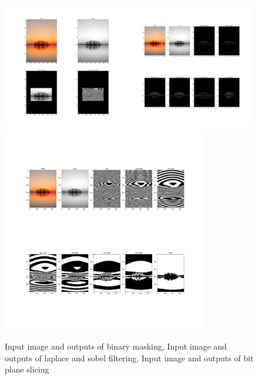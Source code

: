 \documentclass{article}
\begin{document}
{{        \begin{figure}[htp]
            \centering
            \includegraphics[width=0.49\textwidth]{Assignment-5/mask-img.jpg}
            \includegraphics[width=0.49\textwidth]{Assignment-5/Laplace-&-Sobel-Filtering.jpg}
            \includegraphics[width=0.8\textwidth]{Assignment-5/bit-wise-image.jpg}
            \caption{Input image and outputs of binary masking, Input image and outputs of laplace and sobel filtering, Input image and outputs of bit plane slicing}
        \end{figure}
    }
}
\clearpage
\end{document}
